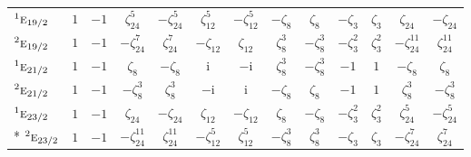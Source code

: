 \documentclass[10pt,a4paper]{article}
\numberwithin{equation}{section}
\newcommand{\irr}[1]{\text{\normalfont\scshape #1}}
\newcommand{\conjpair}[1]{{}^{#1}}
\newcommand{\iunit}{\mathrm{i}}
\newcommand{\rootunity}[1]{\zeta_{#1}}
\begin{document}
{\begin{longtable}{@{}lcccccccccccc@{}}
$\conjpair{1}\irr{e}_{19/2}$ & $1$ & $-1$ & $\rootunity{24}^{5}$ & $-\rootunity{24}^{5}$ & $\rootunity{12}^{5}$ & $-\rootunity{12}^{5}$ & $-\rootunity{8}$ & $\rootunity{8}$ & $-\rootunity{3}$ & $\rootunity{3}$ & $\rootunity{24}$ & $-\rootunity{24}$\\
$\conjpair{2}\irr{e}_{19/2}$ & $1$ & $-1$ & $-\rootunity{24}^{7}$ & $\rootunity{24}^{7}$ & $-\rootunity{12}$ & $\rootunity{12}$ & $\rootunity{8}^{3}$ & $-\rootunity{8}^{3}$ & $-\rootunity{3}^{2}$ & $\rootunity{3}^{2}$ & $-\rootunity{24}^{11}$ & $\rootunity{24}^{11}$\\
$\conjpair{1}\irr{e}_{21/2}$ & $1$ & $-1$ & $\rootunity{8}$ & $-\rootunity{8}$ & $\iunit{}$ & $-\iunit{}$ & $\rootunity{8}^{3}$ & $-\rootunity{8}^{3}$ & $-1$ & $1$ & $-\rootunity{8}$ & $\rootunity{8}$\\
$\conjpair{2}\irr{e}_{21/2}$ & $1$ & $-1$ & $-\rootunity{8}^{3}$ & $\rootunity{8}^{3}$ & $-\iunit{}$ & $\iunit{}$ & $-\rootunity{8}$ & $\rootunity{8}$ & $-1$ & $1$ & $\rootunity{8}^{3}$ & $-\rootunity{8}^{3}$\\
$\conjpair{1}\irr{e}_{23/2}$ & $1$ & $-1$ & $\rootunity{24}$ & $-\rootunity{24}$ & $\rootunity{12}$ & $-\rootunity{12}$ & $\rootunity{8}$ & $-\rootunity{8}$ & $-\rootunity{3}^{2}$ & $\rootunity{3}^{2}$ & $\rootunity{24}^{5}$ & $-\rootunity{24}^{5}$\\*
$\conjpair{2}\irr{e}_{23/2}$ & $1$ & $-1$ & $-\rootunity{24}^{11}$ & $\rootunity{24}^{11}$ & $-\rootunity{12}^{5}$ & $\rootunity{12}^{5}$ & $-\rootunity{8}^{3}$ & $\rootunity{8}^{3}$ & $-\rootunity{3}$ & $\rootunity{3}$ & $-\rootunity{24}^{7}$ & $\rootunity{24}^{7}$\\
\bottomrule\end{longtable}}
\end{document}

